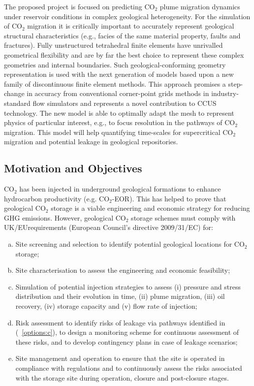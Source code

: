 \documentclass[12pts,a4paper,amsmath,amssymb,floatfix]{article}%
\newcommand{\CO}{CO\ensuremath{_{2}}}
\begin{document}
The proposed project is focused on predicting \CO\; plume migration dynamics under reservoir conditions in complex geological heterogeneity. For the simulation of \CO\; migration it is critically important to accurately represent geological structural characteristics (e.g., facies of the same material property, faults and fractures).  Fully unstructured tetrahedral finite elements have unrivalled geometrical flexibility and are by far the best choice to represent these complex geometries and internal boundaries. Such geological-conforming geometry representation is used with the next generation of models based upon a new family of discontinuous finite element methods. This approach promises a step-change in accuracy from conventional corner-point grids methods in industry-standard flow simulators and represents a novel contribution to CCUS technology. The new model is able to optimally adapt the mesh to represent physics of particular interest, e.g., to focus resolution in the pathways of \CO\; migration.  This model will help quantifying time-scales for supercritical \CO\; migration and potential leakage in geological repositories.

\subsection{Motivation and Objectives}
\CO\; has been injected in underground geological formations to enhance hydrocarbon productivity (e.g. \CO-EOR). %
This has helped to prove that geological \CO\; storage is a viable engineering and economic strategy for reducing GHG emissions. However, geological \CO\; storage schemes must comply with UK/EUrequirements (European Council's directive 2009/31/EC) for:
\begin{enumerate}[(a)]
%
   \item Site screening and selection to identify potential geological locations for \CO\; storage;\label{options:a}
%
   \item Site characterisation to assess the engineering and economic feasibility;\label{options:b}
%
   \item Simulation of potential injection strategies to assess (i) pressure and stress distribution and their evolution in time, (ii) plume migration, (iii) oil recovery, (iv) storage capacity and (v) flow rate of injection;\label{options:c}
%
   \item Risk assessment to identify risks of leakage via pathways identified in (~\ref{options:c}), to design a monitoring scheme for continuous assessment of these risks, and to develop contingency plans in case of  leakage scenarios;\label{options:d}
%
   \item Site management and operation to ensure that the site is operated in compliance with regulations and to continuously assess the risks associated with the storage site during operation, closure and post-closure stages.\label{options:e} 
%
\end{enumerate}
 
\end{document}

